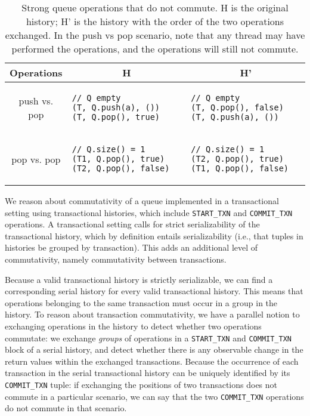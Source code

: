 \begin{table}[t]
    \singlespace
    \centering
    \begin{tabular}{|c|l|l|}
        \hline
        Operations & \multicolumn{1}{c}{H} & \multicolumn{1}{|c|}{H'} \\
        \hline
    
        push vs. pop &
\begin{lstlisting}
// Q empty
(T, Q.push(a), ())                       
(T, Q.pop(), true)
\end{lstlisting} &
\begin{lstlisting}
// Q empty
(T, Q.pop(), false)
(T, Q.push(a), ())                       
\end{lstlisting}\\
\hline

    pop vs. pop &
\begin{lstlisting}
// Q.size() = 1
(T1, Q.pop(), true)
(T2, Q.pop(), false)                       
\end{lstlisting} &
\begin{lstlisting}
// Q.size() = 1
(T2, Q.pop(), true)
(T1, Q.pop(), false)                       
\end{lstlisting}\\
    \hline

    \end{tabular}
    \caption[Strong queue operations that do not commute]{Strong queue operations that do not commute. H is the original history; H' is the history with the order of the two operations exchanged. In the push vs pop scenario, note that any thread may have performed the operations, and the operations will still not commute.}
    \label{tab:strongq_commute}
    \end{table}

We reason about commutativity of a queue implemented in a transactional setting using transactional histories, which include \texttt{START\_TXN} and \texttt{COMMIT\_TXN} operations. A transactional setting calls for strict serializability of the transactional history, which by definition entails serializability (i.e., that tuples in histories be grouped by transaction). This adds an additional level of commutativity, namely commutativity between transactions.

Because a valid transactional history is strictly serializable, we can find a corresponding serial history for every valid transactional history. This means that operations belonging to the same transaction must occur in a group in the history. To reason about transaction commutativity, we have a parallel notion to exchanging operations in the history to detect whether two operations commutate:  we exchange \emph{groups} of operations in a \texttt{START\_TXN} and \texttt{COMMIT\_TXN} block of a serial history, and detect whether there is any observable change in the return values within the exchanged transactions. Because the occurrence of each transaction in the serial transactional history can be uniquely identified by its \texttt{COMMIT\_TXN} tuple: if exchanging the positions of two transactions does not commute in a particular scenario, we can say that the two \texttt{COMMIT\_TXN} operations do not commute in that scenario.

